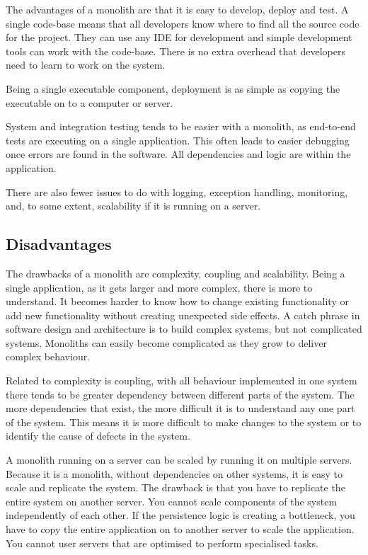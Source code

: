The advantages of a monolith are that it is easy to develop, deploy and test.
A single code-base means that all developers know where to find all the source code for the project.
They can use any IDE for development and simple development tools can work with the code-base.
There is no extra overhead that developers need to learn to work on the system.

Being a single executable component, deployment is as simple as copying the executable on to a computer or server.

System and integration testing tends to be easier with a monolith, as end-to-end tests are executing on a single application.
This often leads to easier debugging once errors are found in the software.
All dependencies and logic are within the application.	

There are also fewer issues to do with logging, exception handling, monitoring,
and, to some extent, scalability if it is running on a server.

\subsection{Disadvantages}

The drawbacks of a monolith are complexity, coupling and scalability.
Being a single application, as it gets larger and more complex, there is more to understand.
It becomes harder to know how to change existing functionality or add new functionality without creating unexpected side effects.
A catch phrase in software design and architecture is to build complex systems, but not complicated systems.
Monoliths can easily become complicated as they grow to deliver complex behaviour.

Related to complexity is coupling, with all behaviour implemented in one system
there tends to be greater dependency between different parts of the system.
The more dependencies that exist, the more difficult it is to understand any one part of the system.
This means it is more difficult to make changes to the system or to identify the cause of defects in the system.

A monolith running on a server can be scaled by running it on multiple servers.
Because it is a monolith, without dependencies on other systems, it is easy to scale and replicate the system.
The drawback is that you have to replicate the entire system on another server.
You cannot scale components of the system independently of each other.
If the persistence logic is creating a bottleneck, you have to copy the entire application on to another server to scale the application.
You cannot user servers that are optimised to perform specialised tasks.

